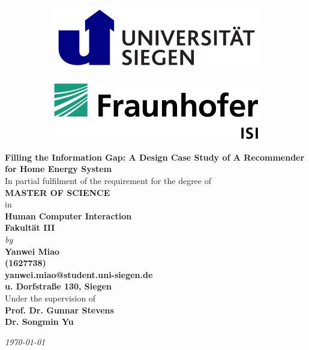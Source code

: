 \begin{titlepage}

\begin{center}

\vspace*{-1cm}

\begin{figure}[h]
  \begin{subfigure}{0.50\textwidth}
    \includegraphics[width=0.8\linewidth, left]{Images/siegen.png}
  \end{subfigure}
  \begin{subfigure}{0.49\textwidth}
    \includegraphics[width=0.8\linewidth, right]{Images/isi.jpeg}
  \end{subfigure}
\end{figure}

\vfill

{\Large \bf Filling the Information Gap: A Design Case Study of A Recommender for Home Energy System} \\

\vfill
In partial fulfilment of the requirement for the degree of\\
{\large \bf MASTER OF SCIENCE}\\
in\\ 
{\large \bf Human Computer Interaction } \\
{\large \bf Fakultät III } \\
{\em by} \\
{\large \bf Yanwei Miao} \\
{\large \bf (1627738)}\\
{\large \bf yanwei.miao@student.uni-siegen.de} \\
{\large \bf u. Dorfstraße 130, Siegen} \\


Under the supervision of \\
{\bf \large Prof. Dr. Gunnar Stevens} \\
{\bf \large Dr. Songmin Yu} \\

\vfill

{\it \large \today}

\end{center}

\end{titlepage}

\clearpage